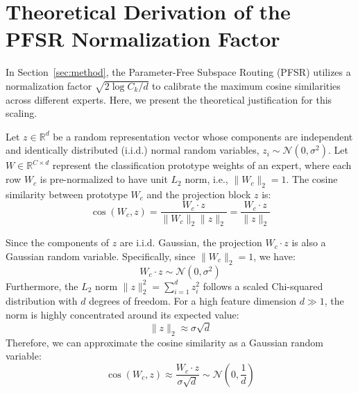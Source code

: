 \documentclass{article}
\theoremstyle{plain}
\theoremstyle{definition}
\theoremstyle{remark}
\begin{document}










\newpage
\appendix
\onecolumn
\section{Theoretical Derivation of the PFSR Normalization Factor}
\label{app:pfsr_norm}

In Section~\ref{sec:method}, the Parameter-Free Subspace Routing (PFSR) utilizes a normalization factor $\sqrt{2\log C_k / d}$ to calibrate the maximum cosine similarities across different experts. Here, we present the theoretical justification for this scaling.

Let $z \in \mathbb{R}^d$ be a random representation vector whose components are independent and identically distributed (i.i.d.) normal random variables, $z_i \sim \mathcal{N}(0, \sigma^2)$. Let $W \in \mathbb{R}^{C \times d}$ represent the classification prototype weights of an expert, where each row $W_c$ is pre-normalized to have unit $L_2$ norm, i.e., $\|W_c\|_2 = 1$. The cosine similarity between prototype $W_c$ and the projection block $z$ is:
\begin{equation}
\cos(W_c, z) = \frac{W_c \cdot z}{\|W_c\|_2 \|z\|_2} = \frac{W_c \cdot z}{\|z\|_2}
\end{equation}

Since the components of $z$ are i.i.d. Gaussian, the projection $W_c \cdot z$ is also a Gaussian random variable. Specifically, since $\|W_c\|_2 = 1$, we have:
\begin{equation}
W_c \cdot z \sim \mathcal{N}(0, \sigma^2)
\end{equation}
Furthermore, the $L_2$ norm $\|z\|_2^2 = \sum_{i=1}^d z_i^2$ follows a scaled Chi-squared distribution with $d$ degrees of freedom. For a high feature dimension $d \gg 1$, the norm is highly concentrated around its expected value:
\begin{equation}
\|z\|_2 \approx \sigma \sqrt{d}
\end{equation}
Therefore, we can approximate the cosine similarity as a Gaussian random variable:
\begin{equation}
\cos(W_c, z) \approx \frac{W_c \cdot z}{\sigma \sqrt{d}} \sim \mathcal{N}\left(0, \frac{1}{d}\right)
\end{equation}
\end{document}
